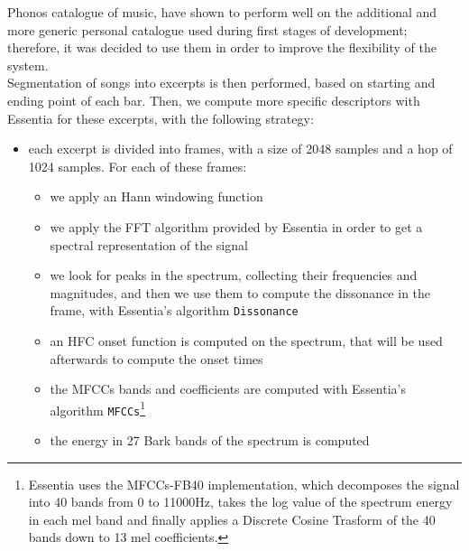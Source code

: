  Phonos catalogue of music, have shown to perform well on the additional and more generic personal catalogue used during first stages of development; therefore, it was decided to use them in order to improve the flexibility of the system. \\ Segmentation of songs into excerpts is then performed, based on starting and ending point of each bar. Then, we compute more specific descriptors with Essentia for these excerpts, with the following strategy:
\begin{itemize}
\item each excerpt is divided into frames, with a size of 2048 samples and a hop of 1024 samples. For each of these frames:
\begin{itemize}
\item we apply an Hann windowing function
\item we apply the FFT algorithm provided by Essentia in order to get a spectral representation of the signal
\item we look for peaks in the spectrum, collecting their frequencies and magnitudes, and then we use them to compute the dissonance in the frame, with Essentia's algorithm \texttt{Dissonance}
\item an HFC onset function is computed on the spectrum, that will be used afterwards to compute the onset times
\item the MFCCs bands and coefficients are computed with Essentia's algorithm \texttt{MFCCs}\footnote{Essentia uses the MFCCs-FB40 implementation, which decomposes the signal into 40 bands from 0 to 11000Hz, takes the log value of the spectrum energy in each mel band and finally applies a Discrete Cosine Trasform of the 40 bands down to 13 mel coefficients.} 
\item the energy in 27 Bark bands of the spectrum is computed 
\begin{figure}[h]\hskip -1cm
\end{figure}
\end{itemize}
\end{itemize}

